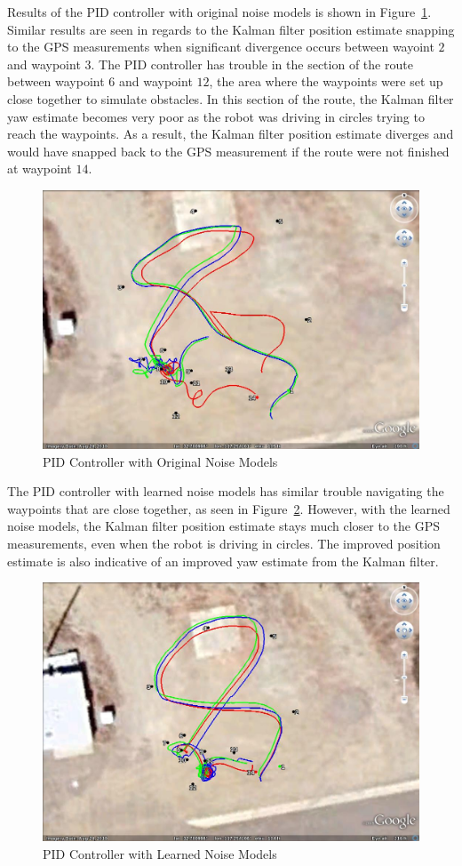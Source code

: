 Results of the PID controller with original noise models is shown in Figure~\ref{fig:kfResults3}.
Similar results are seen in regards to the Kalman filter position estimate snapping to the GPS measurements when significant divergence occurs between wayoint $2$ and waypoint $3$.
The PID controller has trouble in the section of the route between waypoint $6$ and waypoint $12$, the area where the waypoints were set up close together to simulate obstacles.
In this section of the route, the Kalman filter yaw estimate becomes very poor as the robot was driving in circles trying to reach the waypoints.
As a result, the Kalman filter position estimate diverges and would have snapped back to the GPS measurement if the route were not finished at waypoint $14$.

\begin{figure}[ht!]
\centering
\includegraphics[width=.75\textwidth]{images/GE/20101203_1755_kf_pidOrigQR}
\caption{PID Controller with Original Noise Models}%
\label{fig:kfResults3}
\end{figure}

The PID controller with learned noise models has similar trouble navigating the waypoints that are close together, as seen in Figure~\ref{fig:kfResults4}.
However, with the learned noise models, the Kalman filter position estimate stays much closer to the GPS measurements, even when the robot is driving in circles.
The improved position estimate is also indicative of an improved yaw estimate from the Kalman filter.

\begin{figure}[ht!]
\centering
\includegraphics[width=.75\textwidth]{images/GE/20101203_1751_kf_pidNewQR}
\caption{PID Controller with Learned Noise Models}%
\label{fig:kfResults4}
\end{figure}

